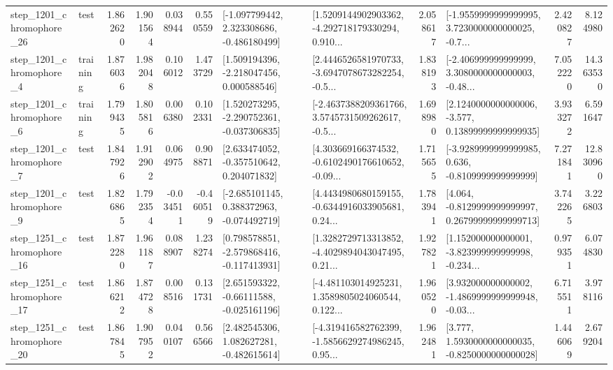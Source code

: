 \begin{tabular}{llrrrrllrlrr}
 step\_1201\_chromophore\_26 &      test &      1.862620 &    1.901564 &      0.038944 &  0.550559 &   [-1.097799442, 2.323308686, -0.486180499] &  [1.5209144902903362, -4.292718179330294, 0.910... &       2.058617 &  [-1.9559999999999995, 3.7230000000000025, -0.7... &            2.420827 &          8.124980 \\
  step\_1201\_chromophore\_4 &  training &      1.876036 &    1.982048 &      0.106012 &  1.473729 &    [1.509194396, -2.218047456, 0.000588546] &  [2.4446526581970733, -3.6947078673282254, -0.5... &       1.838193 &  [-2.406999999999999, 3.3080000000000003, -0.48... &            7.052220 &         14.363530 \\
  step\_1201\_chromophore\_6 &  training &      1.799435 &    1.805816 &      0.006380 &  0.102331 &   [1.520273295, -2.290752361, -0.037306835] &  [-2.4637388209361766, 3.5745731509262617, -0.5... &       1.698980 &  [2.1240000000000006, -3.577, 0.13899999999999935] &            3.933272 &          6.591647 \\
  step\_1201\_chromophore\_7 &      test &      1.847926 &    1.912902 &      0.064975 &  0.908871 &    [2.633474052, -0.357510642, 0.204071832] &  [4.303669166374532, -0.6102490176610652, -0.09... &       1.715655 &  [-3.9289999999999985, 0.636, -0.8109999999999999] &            7.271841 &         12.830960 \\
  step\_1201\_chromophore\_9 &      test &      1.826865 &    1.792354 &     -0.034511 & -0.460519 &   [-2.685101145, 0.388372963, -0.074492719] &  [4.4434980680159155, -0.6344916033905681, 0.24... &       1.783941 &  [4.064, -0.8129999999999997, 0.26799999999999713] &            3.742265 &          3.226803 \\
 step\_1251\_chromophore\_16 &      test &      1.872280 &    1.961187 &      0.088907 &  1.238274 &   [0.798578851, -2.579868416, -0.117413931] &  [1.3282729713313852, -4.4029894043047495, 0.21... &       1.927821 &  [1.152000000000001, -3.823999999999998, -0.234... &            0.979351 &          6.074830 \\
 step\_1251\_chromophore\_17 &      test &      1.866212 &    1.874728 &      0.008516 &  0.131731 &    [2.651593322, -0.66111588, -0.025161196] &  [-4.481103014925231, 1.3589805024060544, 0.122... &       1.960520 &  [3.932000000000002, -1.4869999999999948, -0.03... &            6.715511 &          3.978116 \\
 step\_1251\_chromophore\_20 &      test &      1.867845 &    1.907952 &      0.040107 &  0.566566 &    [2.482545306, 1.082627281, -0.482615614] &  [-4.319416582762399, -1.5856629274986245, 0.95... &       1.962481 &   [3.777, 1.5930000000000035, -0.8250000000000028] &            1.446069 &          2.679204 \\

\end{tabular}
